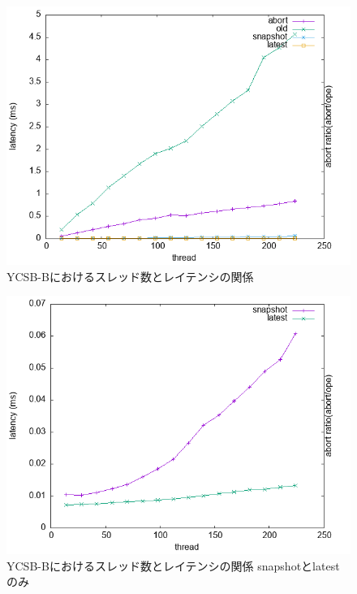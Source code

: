\documentclass[a4paper]{jreport}	%
\begin{document}
\begin{figure}[h] 
\centering
\includegraphics[width=15cm]{data/stable/ycsb-b/latency}
\caption{YCSB-Bにおけるスレッド数とレイテンシの関係}
\label{fig:latency-b}
\end{figure}

\begin{figure}[h] 
\centering
\includegraphics[width=15cm]{data/stable/ycsb-b/latency2}
\caption{YCSB-Bにおけるスレッド数とレイテンシの関係 snapshotとlatestのみ}
\label{fig:latency-b2}
\end{figure}
\end{document}
